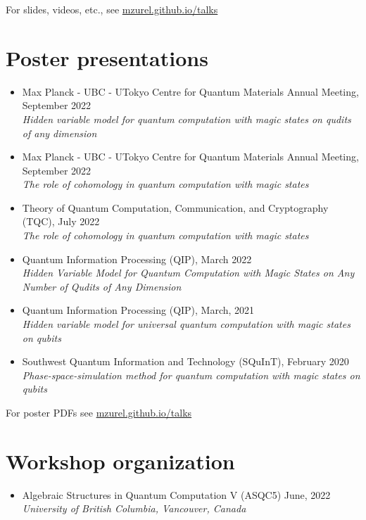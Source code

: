 \documentclass[letterpaper,11pt]{article}
\newcommand{\ConferenceItem}[3]{
	\item{\parbox{0.97\textwidth}{
		{#1}  \hfill {#2}\\
		\emph{#3}
	}}
}
\begin{document}
For slides, videos, etc., see \href{https://mzurel.github.io/talks}{mzurel.github.io/talks}

\section*{Poster presentations}
\begin{itemize}[leftmargin=*]
	\ConferenceItem{Max Planck - UBC - UTokyo Centre for Quantum Materials Annual Meeting, September 2022}{}{Hidden variable model for quantum computation with magic states on qudits of any dimension}
	
	\ConferenceItem{Max Planck - UBC - UTokyo Centre for Quantum Materials Annual Meeting, September 2022}{}{The role of cohomology in quantum computation with magic states}
	
	\ConferenceItem{Theory of Quantum Computation, Communication, and Cryptography (TQC), July 2022}{}{The role of cohomology in quantum computation with magic states}
	
	\ConferenceItem{Quantum Information Processing (QIP), March 2022}{}{Hidden Variable Model for Quantum Computation with Magic States on Any Number of Qudits of Any Dimension}
	
	\ConferenceItem{Quantum Information Processing (QIP), March, 2021}{}{Hidden variable model for universal quantum computation with magic states on qubits}
	
	\ConferenceItem{Southwest Quantum Information and Technology (SQuInT), February 2020}{}{Phase-space-simulation method for quantum computation with magic states on qubits}
\end{itemize}
For poster PDFs see \href{https://mzurel.github.io/talks}{mzurel.github.io/talks}

\section*{Workshop organization}
\begin{itemize}[leftmargin=*]
	\ConferenceItem{Algebraic Structures in Quantum Computation V (ASQC5)}{June, 2022}{University of British Columbia, Vancouver, Canada}
\end{itemize}

\end{document}
